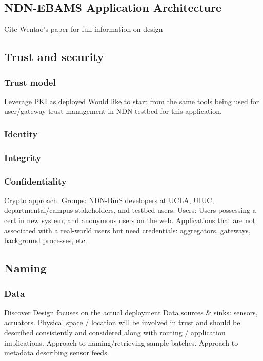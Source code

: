 \subsection{NDN-EBAMS Application Architecture} 
 
Cite Wentao's paper for full information on design

  
  
 \subsection{Trust and security}
\subsubsection{Trust model} 
Leverage PKI as deployed
Would like to start from the same tools being used for user/gateway trust management in NDN testbed for this application.  

\subsubsection{Identity} 

\subsubsection{Integrity} 

\subsubsection{Confidentiality}
Crypto approach.
Groups: NDN-BmS developers at UCLA, UIUC, departmental/campus stakeholders, and testbed users. 
Users:  Users possessing a cert in new system, and anonymous users on the web.
Applications that are not associated with a real-world users but need credentials: aggregators, gateways, background processes, etc. 



\subsection{Naming}
\subsubsection{Data}
Discover
Design focuses on the actual deployment
Data sources \& sinks:  sensors, actuators.
Physical space / location will be involved in trust and should be described consistently and considered along with routing / application implications.
Approach to naming/retrieving sample batches. 
Approach to metadata describing sensor feeds. 

